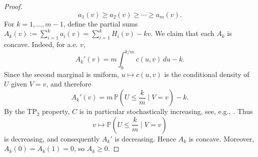\documentclass{article}
\theoremstyle{definition}
\begin{document}
\begin{proof}
    \[
        a_1(v)\ge a_2(v)\ge \cdots \ge a_m(v).
    \]
    For \(k=1,\dots,m-1\), define the partial sums
    \(
        A_k(v):=\sum_{i=1}^k a_i(v)
        =
        \sum_{i=1}^k H_i(v)-kv.
    \)
    We claim that each \(A_k\) is concave. Indeed, for a.e. \(v\),
    \[
        A_k'(v)
        =
        m\int_0^{k/m} c(u,v)\,du-k.
    \]
    Since the second marginal is uniform, \(u\mapsto c(u,v)\) is the conditional density of \(U\) given \(V=v\), and therefore
    \[
        A_k'(v)
        =
        m\,\mathbb P\left(U\le \frac{k}{m}\mid V=v\right)-k.
    \]
    By the TP$_2$ property, $C$ is in particular stochastically increasing, see, e.g., \cite[p.~146]{Mueller-Stoyan-2002}.
    Thus
    \[
        v\mapsto \mathbb P\left(U\le \frac{k}{m}\mid V=v\right)
    \]
    is decreasing, and consequently \(A_k'\) is decreasing.
    Hence \(A_k\) is concave.
    Moreover, \(A_k(0)=A_k(1)=0\), so \(A_k\ge0\).


\end{proof}
\end{document}
